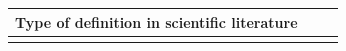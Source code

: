 \documentclass[english, 12pt, a4paper, sci, utf8, a-1b, online]{aaltothesis}
\begin{document}
\newpage
\renewcommand{\arraystretch}{1.5}
\begin{center}
  \begin{longtable}{p{0.3\linewidth}p{0.6\linewidth}}
    \multicolumn{2}{l}{\textbf{Type of definition in scientific literature}}                                                                                                                                                                                                                                                                                                                                                                                                                                                                                                                                                                                                                                                                                                                                                                                                                                                                                                      \\
    \hline                                                                                                                                                                                                                                                                                                                                                                                                                                                                                                                                                                                                                                                                                                                                                                                                                                                                                                                              \\

\end{longtable}
\end{center}
\end{document}
